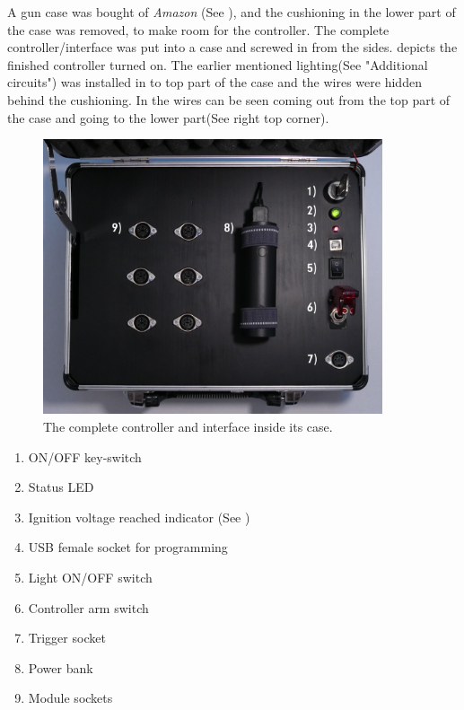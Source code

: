 
\noindent A gun case was bought of \textit{Amazon} (See ), and the cushioning in the lower part of the case was removed, to make room for the controller. The complete controller/interface was put into a case and screwed in from the sides.  depicts the finished controller turned on. The earlier mentioned lighting(See  "Additional circuits") was installed in to top part of the case and the wires were hidden behind the cushioning. In  the wires can be seen coming out from the top part of the case and going to the lower part(See  right top corner).


\begin{figure}[!ht]
    \centering
    \includegraphics[width=10cm]{./Figures/controller_open_legend.png}
    \caption{ The complete controller and interface inside its case. }
    \label{fig:controller_open}     
\end{figure}

\begin{enumerate}
	\item ON/OFF key-switch
	\item Status LED 
	\item Ignition voltage reached indicator (See )
	\item USB female socket for programming
	\item Light ON/OFF switch
	\item Controller arm switch
	\item Trigger socket
	\item Power bank
	\item Module sockets
\end{enumerate}

